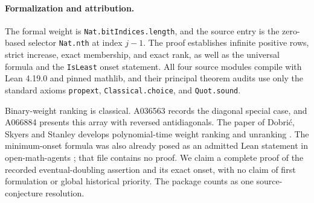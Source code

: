 \paragraph{Formalization and attribution.}
The formal weight is \texttt{Nat.bitIndices.length}, and the source
entry is the zero-based selector \texttt{Nat.nth} at index $j-1$.
The proof establishes infinite positive rows, strict increase, exact
membership, and exact rank, as well as the universal formula and the
\texttt{IsLeast} onset statement. All four source modules compile with
Lean 4.19.0 and pinned mathlib, and their principal theorem audits use
only the standard axioms \texttt{propext}, \texttt{Classical.choice},
and \texttt{Quot.sound}.

Binary-weight ranking is classical. A036563 records the diagonal
special case, and A066884 presents this array with reversed
antidiagonals. The paper of Dobri\'c, Skyers and Stanley develops
polynomial-time weight ranking and unranking \cite{dobric2016}.
The minimum-onset formula was also already posed as an admitted Lean
statement in open-math-agents \cite{oma067576}; that file contains no
proof. We claim a complete proof of the recorded eventual-doubling
assertion and its exact onset, with no claim of first formulation or
global historical priority. The package counts as one source-conjecture
resolution.
